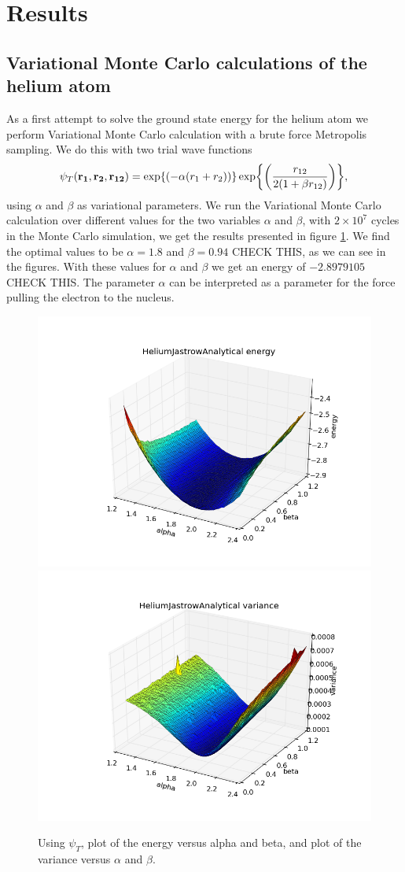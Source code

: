 \section{Results}

	\subsection{Variational Monte Carlo calculations of the helium atom}
		As a first attempt to solve the ground state energy for the helium
		atom we perform Variational Monte Carlo calculation with a brute force
		Metropolis sampling. We do this with two trial wave functions
		\[
		\psi_{T}({\bf r_{1}},{\bf r_{2}},{\bf r_{12}})=\exp{\left(-\alpha(r_{1}+r_{2})\right)}\exp{\left(\frac{r_{12}}{2(1+\beta r_{12})}\right)},
		\]
		using $\alpha$ and $\beta$ as variational parameters. 
		We run the Variational Monte Carlo calculation over
		different values for the two variables $\alpha$ and $\beta$, 
		with $2\times10^{7}$ cycles in the Monte Carlo simulation, we get the results
		presented in figure \ref{fig:HeliumAlphaBeta}.
		We find the optimal values to be  $\alpha=1.8$ and $\beta=0.94$ CHECK THIS, as we can see in the figures.
		With these values for $\alpha$ and $\beta$ we get an energy of $-2.8979105$ CHECK THIS.
		The parameter $\alpha$ can be interpreted as a parameter for the
		force pulling the electron to the nucleus.


		


		\begin{figure}
			\centering \includegraphics[width=0.49\linewidth]{../figures/HeliumJastrowAnalytical_alpha_beta_energy}
			\includegraphics[width=0.49\linewidth]{../figures/HeliumJastrowAnalytical_alpha_beta_variance}
			\protect\caption{Using $\psi_{T}$, plot of the energy versus alpha and beta, and plot of the variance versus $\alpha$ and $\beta$. }
			\label{fig:HeliumAlphaBeta}
		\end{figure}


